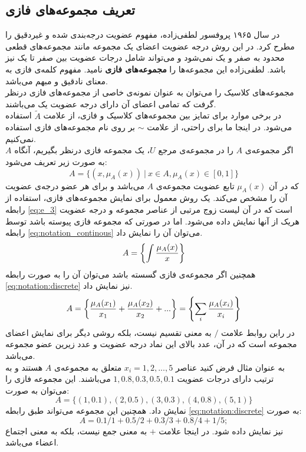\documentclass[12pt,a4paper]{article}
\theoremstyle{definition}
\begin{document}
 \subsection{تعریف مجموعه‌های فازی}
در سال ۱۹۶۵ پروفسور لطفی‌زاده، مفهوم عضویت درجه‌بندی شده و غیردقیق را مطرح کرد. در این روش درجه عضویت اعضای یک مجموعه مانند مجموعه‌های قطعی محدود به صفر و یک نمی‌شود و می‌تواند شامل درجات عضویت بین صفر تا یک نیز باشد. لطفی‌زاده این مجموعه‌ها را 
\textbf{مجموعه‌های فازی}
 نامید. مفهوم کلمه‌ی فازی به معنای نادقیق و مبهم می‌باشد. \\
 مجموعه‌های کلاسیک را می‌توان به عنوان نمونه‌ی خاصی از مجموعه‌های فازی درنظر گرفت که تمامی اعضای آن دارای درجه عضویت یک می‌باشند.
 \cite{Bojadziev2007}
 \\
 در برخی موارد برای تمایز بین مجموعه‌های کلاسیک و فازی، از علامت $\widetilde{A}$ استفاده می‌شود. 
 \cite{Lee2005}
 در اینجا ما برای راحتی، از علامت $ \sim $ بر روی نام مجموعه‌های فازی استفاده نمی‌کنیم.
 \\
 اگر مجموعه‌ی $A$ را در مجموعه‌ی مرجع $U$، یک مجموعه فازی درنظر بگیریم، آنگاه $A$ به صورت زیر تعریف می‌شود:
\begin{equation}\label{eq:e_3}
A= \{  (x, \mu_{A}(x))\ |\ x \in A, \mu_{A}(x) \in [0,1]  \}
\end{equation} 
که در آن $\mu_{A}(x)$ تابع عضویت مجموعه‌ی $A$ می‌باشد و برای هر عضو درجه‌ی عضویت آن را مشخص می‌کند. 
 یک روش معمول برای نمایش مجموعه‌های فازی، استفاده از رابطه 
\ref{eq:e_3}
است که در آن لیست زوج مرتبی از عناصر مجموعه و درجه عضویت هریک از آنها نمایش داده می‌شود.
اما در صورتی که مجموعه فازی پیوسته باشد توسط رابطه 
\ref{eq:notation_continous}
می‌توان آن را نمایش داد.
\begin{equation}\label{eq:notation_continous}
A=\left\lbrace  \int {\mu_{A}(x) \over x} \right\rbrace
\end{equation}
همچنین اگر مجموعه‌ی فازی گسسته باشد می‌توان آن را به صورت رابطه 
\ref{eq:notation:discrete}
نیز نمایش داد.
\cite{Ross2004}
\begin{equation}\label{eq:notation:discrete}
	A=\left\lbrace {\mu_{A}(x_1) \over x_1}+{\mu_{A}(x_2) \over x_2}+... \right\rbrace = \left\lbrace \sum_{i} {\mu_{A}(x_i) \over x_i}\right\rbrace 
\end{equation}
در راین روابط علامت $/$ به معنی تقسیم نیست، بلکه روشی دیگر برای نمایش اعضای مجموعه است که در آن، عدد بالای این نماد درجه عضویت و عدد زیرین عضو مجموعه می‌باشد.
 \cite{Bojadziev2007}
 \\
به عنوان مثال فرض کنید عناصر 
$ x_{i}=1,2,...,5 $
متعلق به مجموعه‌ی $A$ هستند و به ترتیب دارای درجات عضویت 
$1, 0.8, 0.3, 0.5, 0.1$
می‌باشند. این مجموعه فازی را می‌توان به صورت:
\begin{equation}
A = \{ ( 1, 0.1), (2, 0.5), (3, 0.3), (4, 0.8), (5, 1)\}
\end{equation}
 نمایش داد. همچنین این مجموعه می‌تواند طبق رابطه 
 \ref{eq:notation:discrete}
 به صورت:
 \begin{equation}
A= 0.1/1 + 0.5/2 + 0.3/3 + 0.8/4 + 1/5;
 \end{equation}
نیز نمایش داده شود. در اینجا علامت $ + $ به معنی جمع نیست، بلکه به معنی اجتماع اعضاء می‌باشد. 
\cite{Lee2005}
\\
\end{document}
